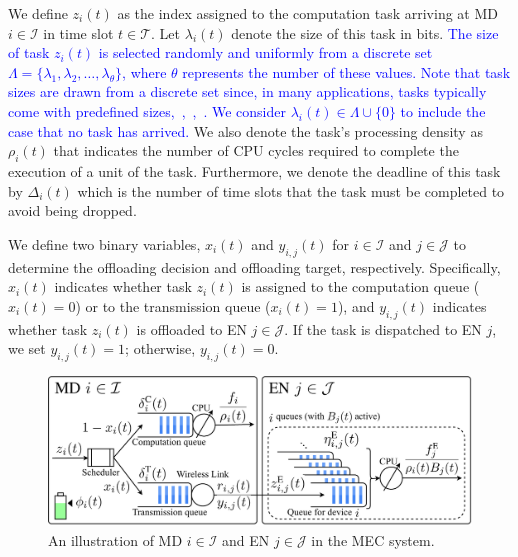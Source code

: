 \documentclass[10pt, journal,letterpaper]{IEEEtran}
\begin{document}
We define $z_i(t)$ as the index assigned to the computation task arriving at MD $i \in \mathcal{I}$ in time slot $t \in \mathcal{T}$. Let $\lambda_i(t)$ denote the size of this task in bits. \textcolor{blue}{The size of task \( z_i(t) \) is selected randomly and uniformly from a discrete set \( \Lambda = \{\lambda_1, \lambda_2, \ldots, \lambda_{\theta}\} \), where \( \theta \) represents the number of these values. Note that task sizes are drawn from a discrete set since, in many applications, tasks typically come with predefined sizes,~\cite{wang2020intelligent},~\cite{zhang2019toward},~\cite{allahham2022multi}. We consider $\lambda_i(t) \in \Lambda \cup \{0\}$ to include the case that no task has arrived.} We also denote the task's processing density as $\rho_i(t)$ that indicates the number of CPU cycles required to complete the execution of a unit of the task. Furthermore, we denote the deadline of this task by $\Delta_i(t)$ which is the number of time slots that the task must be completed to avoid being dropped.

We define two binary variables, $x_i(t)$ and $y_{i,j}(t)$ for $i \in \mathcal{I}$ and $j \in \mathcal{J}$ to determine the offloading decision and offloading target, respectively. Specifically, $x_i(t)$ indicates whether task $z_i(t)$ is assigned to the computation queue ($x_i(t) = 0$) or to the transmission queue ($x_i(t) = 1$), and $y_{i,j}(t)$ indicates whether task $z_i(t)$ is offloaded to EN $j \in \mathcal{J}$. If the task is dispatched to EN $j$, we set $y_{i,j}(t) = 1$; otherwise, $y_{i,j}(t) = 0$.


 \begin{figure}
 	\captionsetup{name=Fig.}
 	\centering
 	\includegraphics[width=1\linewidth]{ queue}
 	\vspace*{-5mm}
 	\caption{An illustration of MD $i \in \mathcal{I}$ and EN $j \in \mathcal{J}$ in the MEC system.}
 	\label{fig1}
 \end{figure}
\end{document}
